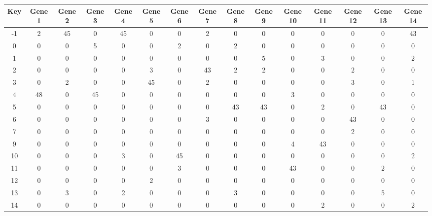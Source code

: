 \begin{tabular}{|c|c|c|c|c|c|c|c|c|c|c|c|c|c|c|}
\hline
Key & Gene 1 & Gene 2 & Gene 3 & Gene 4 & Gene 5 & Gene 6 & Gene 7 & Gene 8 & Gene 9 & Gene 10 & Gene 11 & Gene 12 & Gene 13 & Gene 14 \\
\hline
-1 & 2 & 45 & 0 & 45 & 0 & 0 & 2 & 0 & 0 & 0 & 0 & 0 & 0 & 43 \\
0 & 0 & 0 & 5 & 0 & 0 & 2 & 0 & 2 & 0 & 0 & 0 & 0 & 0 & 0 \\
1 & 0 & 0 & 0 & 0 & 0 & 0 & 0 & 0 & 5 & 0 & 3 & 0 & 0 & 2 \\
2 & 0 & 0 & 0 & 0 & 3 & 0 & 43 & 2 & 2 & 0 & 0 & 2 & 0 & 0 \\
3 & 0 & 2 & 0 & 0 & 45 & 0 & 2 & 0 & 0 & 0 & 0 & 3 & 0 & 1 \\
4 & 48 & 0 & 45 & 0 & 0 & 0 & 0 & 0 & 0 & 3 & 0 & 0 & 0 & 0 \\
5 & 0 & 0 & 0 & 0 & 0 & 0 & 0 & 43 & 43 & 0 & 2 & 0 & 43 & 0 \\
6 & 0 & 0 & 0 & 0 & 0 & 0 & 3 & 0 & 0 & 0 & 0 & 43 & 0 & 0 \\
7 & 0 & 0 & 0 & 0 & 0 & 0 & 0 & 0 & 0 & 0 & 0 & 2 & 0 & 0 \\
9 & 0 & 0 & 0 & 0 & 0 & 0 & 0 & 0 & 0 & 4 & 43 & 0 & 0 & 0 \\
10 & 0 & 0 & 0 & 3 & 0 & 45 & 0 & 0 & 0 & 0 & 0 & 0 & 0 & 2 \\
11 & 0 & 0 & 0 & 0 & 0 & 3 & 0 & 0 & 0 & 43 & 0 & 0 & 2 & 0 \\
12 & 0 & 0 & 0 & 0 & 2 & 0 & 0 & 0 & 0 & 0 & 0 & 0 & 0 & 0 \\
13 & 0 & 3 & 0 & 2 & 0 & 0 & 0 & 3 & 0 & 0 & 0 & 0 & 5 & 0 \\
14 & 0 & 0 & 0 & 0 & 0 & 0 & 0 & 0 & 0 & 0 & 2 & 0 & 0 & 2 \\
\hline
\end{tabular}